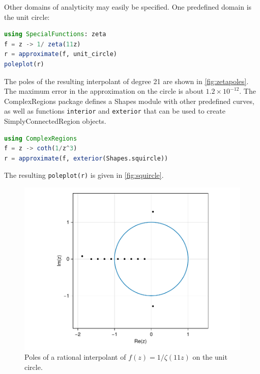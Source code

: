 \documentclass{juliacon}
\begin{document}
Other domains of analyticity may easily be specified. One predefined domain is the unit circle: 
\begin{lstlisting}[language = Julia, caption={Approximation on the unit circle.}]
using SpecialFunctions: zeta
f = z -> 1/ zeta(11z)
r = approximate(f, unit_circle)
poleplot(r)
\end{lstlisting}
The poles of the resulting interpolant of degree 21 are shown in \autoref{fig:zetapoles}. The maximum error in the approximation on the circle is about $1.2\times 10^{-12}$. The \textsf{ComplexRegions} package defines a \textsf{Shapes} module with other predefined curves, as well as functions \verb|interior| and \verb|exterior| that can be used to create \textsf{SimplyConnectedRegion} objects.
\begin{lstlisting}[language = Julia, caption={Approximation on an exterior domain.}]
using ComplexRegions
f = z -> coth(1/z^3)
r = approximate(f, exterior(Shapes.squircle))
\end{lstlisting}
The resulting \verb|poleplot(r)| is given in \autoref{fig:squircle}.

\begin{figure}
\centering
\includegraphics[width=\columnwidth]{zetapoles.pdf}
\caption{Poles of a rational interpolant of $f(z) = 1/\zeta(11z)$ on the unit circle.}
\label{fig:zetapoles}
\end{figure}
\end{document}
